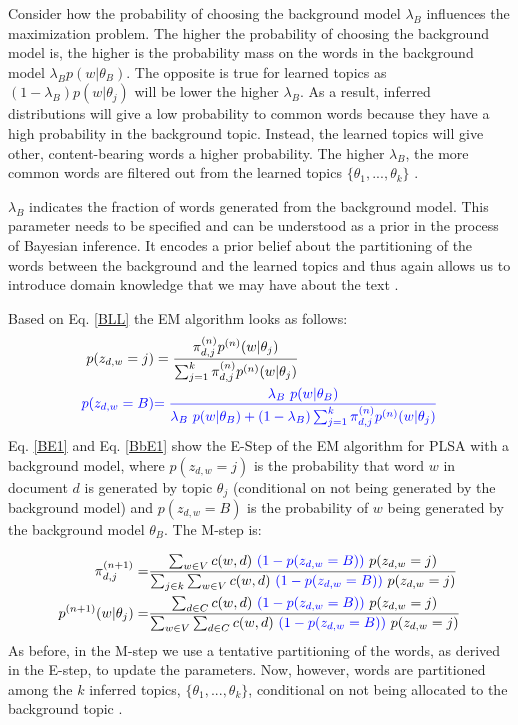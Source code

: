 \documentclass[11pt,a4paper,english,oneside]{book}
\numberwithin{equation}{chapter}
\begin{document}
Consider how the probability of choosing the background model $\lambda_B$ influences the maximization problem. The higher the probability of choosing the background model is, the higher is the probability mass on the words in the background model $\lambda_B  p(w|\theta_B)$.  The opposite is true for learned topics as $(1-\lambda_B)  p(w|\theta_j)$ will be lower the higher $\lambda_B$. As a result, inferred distributions will give a low probability to common words because they have a high probability in the background topic. Instead, the learned topics will give other, content-bearing words a higher probability. The higher $\lambda_B$, the more common words are filtered out from the learned topics $\{\theta_1, ..., \theta_k\}$ \citep[p. 352--359]{Zhai.2016}.  

$\lambda_B$ indicates the fraction of words generated from the background model. This parameter needs to be specified and can be understood as a prior in the process of Bayesian inference. It encodes a prior belief about the partitioning of the words between the background and the learned topics and thus again allows us to introduce domain knowledge that we may have about the text \citep[p. 361, 372--376]{Zhai.2016}. 

Based on Eq. \ref{BLL} the EM algorithm looks as follows:
\begin{align}\label{BE1}
p(z_{d,w}=j)&=\frac{\pi_{d,j}^{(n)}p^{(n)}(w|\theta_j)}{\sum_{j=1}^{k}\pi_{d,j}^{(n)}p^{(n)}(w|\theta_j)}\\
\label{BbE1}
\textcolor{blue}{ p(z_{d,w}=B)} & \textcolor{blue}{ =\frac{\lambda_B \ p(w|\theta_B)}{\lambda_B \ p(w|\theta_B) + (1-\lambda_B) \sum_{j=1}^{k}\pi_{d,j}^{(n)}p^{(n)}(w|\theta_j)} }
\end{align}
Eq. \ref{BE1} and Eq. \ref{BbE1} show the E-Step of the EM algorithm for PLSA with a background model, where $p(z_{d,w}=j)$ is the probability that word $w$ in document $d$ is generated by topic $\theta_j$ (conditional on not being generated by the background model) and $p(z_{d,w}=B)$ is the probability of $w$ being generated by the background model $\theta_B$. The M-step is:

\begin{align}%
\label{BM1pi} \pi_{d,j}^{(n+1)}=&\frac{\sum_{w \in V} c(w,d) \ \textcolor{blue}{(1-p(z_{d,w}=B))}\ p(z_{d,w}=j)}{\sum_{j \in k}\sum_{w \in V}c(w,d) \ \textcolor{blue}{(1-p(z_{d,w}=B))} \ p(z_{d,w}=j)}\\
\label{BM1theta} p^{(n+1)}(w|\theta_j)=&\frac{\sum_{d \in C} c(w,d) \ \textcolor{blue}{(1-p(z_{d,w}=B))} \ p(z_{d,w}=j)}{\sum_{w \in V}\sum_{d \in C}c(w,d)\ \textcolor{blue}{(1-p(z_{d,w}=B))}\ p(z_{d,w}=j)}
\end{align}
As before, in the M-step we use a tentative partitioning of the words, as derived in the E-step, to update the parameters. Now, however, words are partitioned among the $k$ inferred topics, $\{\theta_1, ..., \theta_k\}$, conditional on not being allocated to the background topic \citep[p. 372--376]{Zhai.2016}. 
\end{document}
